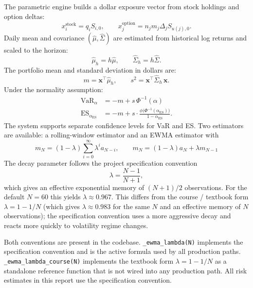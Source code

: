 \documentclass[11pt]{article}
\DeclareMathOperator{\VaR}{VaR}
\DeclareMathOperator{\ES}{ES}
\begin{document}
The parametric engine builds a dollar exposure vector from stock holdings
and option deltas:
\begin{equation}
  x_i^{\mathrm{stock}} = q_i S_{i,0},
  \qquad
  x_j^{\mathrm{option}} = n_j m_j \Delta_j S_{u(j),0}.
  \label{eq:exposure}
\end{equation}
Daily mean and covariance $(\hat{\mu}, \hat{\Sigma})$ are estimated from
historical log returns and scaled to the horizon:
\[
  \hat{\mu}_h = h\hat{\mu}, \qquad \hat{\Sigma}_h = h\hat{\Sigma}.
\]
The portfolio mean and standard deviation in dollars are:
\begin{equation}
  m = \mathbf{x}^{\!\top}\hat{\mu}_h,
  \qquad
  s^2 = \mathbf{x}^{\!\top}\hat{\Sigma}_h\,\mathbf{x}.
  \label{eq:port_moments}
\end{equation}
Under the normality assumption:
\begin{align}
  \VaR_\alpha &= -m + s\,\Phi^{-1}(\alpha)
  \label{eq:parametric_var}\\[4pt]
  \ES_{\alpha_{\mathrm{ES}}} &= -m + s\cdot
    \frac{\phi\!\bigl(\Phi^{-1}(\alpha_{\mathrm{ES}})\bigr)}{1 - \alpha_{\mathrm{ES}}}.
  \label{eq:parametric_es}
\end{align}
The system supports separate confidence levels for VaR and ES.  Two
estimators are available: a rolling-window estimator and an EWMA estimator
with
\begin{equation}
  m_N = (1-\lambda)\sum_{i=0}^{\infty}\lambda^i a_{N-i},
  \qquad
  m_N = (1-\lambda)a_N + \lambda m_{N-1}
  \label{eq:ewma_course_mean}
\end{equation}
The decay parameter follows the project specification convention
\begin{equation}
  \lambda = \frac{N-1}{N+1},
  \label{eq:ewma_lambda_impl}
\end{equation}
which gives an effective exponential memory of $(N+1)/2$ observations.
For the default $N=60$ this yields $\lambda \approx 0.967$.  This differs
from the course / textbook form $\lambda = 1 - 1/N$ (which gives $\lambda
\approx 0.983$ for the same $N$ and an effective memory of $N$ observations);
the specification convention uses a more aggressive decay and reacts more
quickly to volatility regime changes.

Both conventions are present in the codebase.
\texttt{\_ewma\_lambda(N)} implements the specification convention and is the
active formula used by all production paths.
\texttt{\_ewma\_lambda\_course(N)} implements the textbook form
$\lambda = 1 - 1/N$ as a standalone reference function that is not wired
into any production path.  All risk estimates in this report use the
specification convention.
\end{document}
